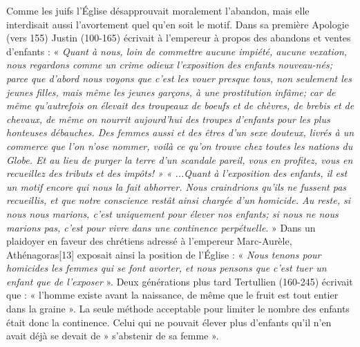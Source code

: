 Comme les juifs l'Église désapprouvait moralement l'abandon, mais elle interdisait aussi l'avortement quel qu'en soit le motif. 
 Dans sa première Apologie (vers 155) Justin (100-165) écrivait à l'empereur à propos des abandons et ventes d'enfants : « \emph{Quant à nous, loin de commettre aucune impiété, aucune vexation, nous regardons comme un crime odieux l'exposition des enfants nouveau-nés; parce que d'abord nous voyons que c'est les vouer presque tous, non seulement les jeunes filles, mais même les jeunes garçons, à une prostitution infâme; car de même qu'autrefois on élevait des troupeaux de boeufs et de chèvres, de brebis et de chevaux, de même on nourrit aujourd'hui des troupes d'enfants pour les plus honteuses débauches. Des femmes aussi et des êtres d'un sexe douteux, livrés à un commerce que l'on n'ose nommer, voilà ce qu'on trouve chez toutes les nations du Globe. Et au lieu de purger la terre d'un scandale pareil, vous en profitez, vous en recueillez des tributs et des impôts! »}
 \emph{« ...Quant à l'exposition des enfants, il est un motif encore qui nous la fait abhorrer. Nous craindrions qu'ils ne fussent pas recueillis, et que notre conscience restât ainsi chargée d'un homicide. Au reste, si nous nous marions, c'est uniquement pour élever nos enfants; si nous ne nous marions pas, c'est pour vivre dans une continence perpétuelle}. »
 Dans un plaidoyer en faveur des chrétiens adressé à l'empereur Marc-Aurèle, Athénagoras[13] exposait ainsi la position de l'Église : « \emph{Nous tenons pour homicides les femmes qui se font avorter, et nous pensons que c'est tuer un enfant que de l'exposer} ». 
 Deux générations plus tard Tertullien (160-245) écrivait que : « l'homme existe avant la naissance, de même que le fruit est tout entier dans la graine ». 
 La seule méthode acceptable pour limiter le nombre des enfants était donc la continence. Celui qui ne pouvait élever plus d'enfants qu'il n'en avait déjà se devait de » s'abstenir de sa femme ».
 
